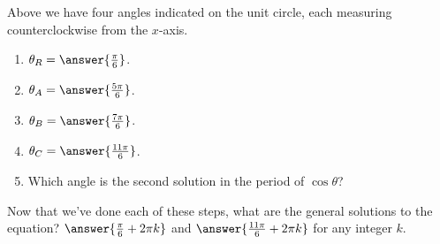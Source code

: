\documentclass{ximera}
\begin{document}
\begin{exercise}
\begin{exercise}
\begin{image}
				\end{image}
Above we have four angles indicated on the unit circle, each measuring counterclockwise from the $x$-axis.
\begin{enumerate}
\item $\theta_R = \answer{\frac{\pi}{6}}$.

\item $\theta_A = \answer{\frac{5\pi}{6}}$.

\item $\theta_B = \answer{\frac{7\pi}{6}}$.

\item $\theta_C = \answer{\frac{11\pi}{6}}$.

\item Which angle is the second solution in the period of $\cos \theta$? 
\begin{multipleChoice}
\end{multipleChoice}
\end{enumerate}

 \begin{exercise}
Now that we've done each of these steps, what are the general solutions to the equation? $\answer{\frac{\pi}{6} + 2\pi k}$ and $\answer{\frac{11\pi}{6} + 2\pi k}$ for any integer $k$.
	

\end{exercise}
\end{exercise}
\end{exercise}
\end{document}
